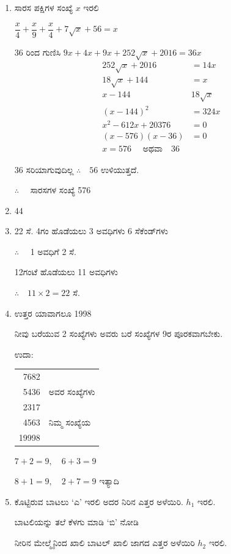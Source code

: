\begin{enumerate}
\item ಸಾರಸ ಪಕ್ಷಿಗಳ ಸಂಖ್ಯೆ $x$ ಇರಲಿ 

$\dfrac{x}{4} + \dfrac{x}{9} + \dfrac{x}{4} + 7\sqrt{x} + 56 = x$

36 ರಿಂದ ಗುಣಿಸಿ $9x + 4x + 9x + 252\sqrt{x} + 2016 = 36x$
\begin{align*}
252\sqrt{x} + 2016 & = 14x\\
18\sqrt{x} + 144 & = x\\
x - 144 & 18\sqrt{x}\\
(x - 144)^{2} & = 324x\\
x^{2} - 612x + 20376 & = 0\\
(x - 576) (x - 36) & = 0\\
x = 576\quad \text{ ಅಥವಾ}\quad 36 & 
\end{align*}

36 ಸರಿಯಾಗುವುದಿಲ್ಲ $\therefore\quad 56$ ಉಳಿಯುತ್ತದೆ. 

$\therefore\quad$ ಸಾರಸಗಳ ಸಂಖ್ಯೆ 576

\item 44

\item 22 ಸೆ. 4ಗಂ ಹೊಡೆಯಲು 3 ಅವಧಿಗಳು 6 ಸೆಕೆಂಡ್‌ಗಳು 

$\therefore\quad$ 1 ಅವಧಿಗೆ 2 ಸೆ.

12ಗಂಟೆ ಹೊಡೆಯಲು 11 ಅವಧಿಗಳು 

$\therefore\quad 11\times 2 = 22$ ಸೆ. 

\item ಉತ್ತರ ಯಾವಾಗಲೂ 1998

ನೀವು ಬರೆಯುವ 2 ಸಂಖ್ಯೆಗಳು ಅವರು ಬರೆ ಸಂಖ್ಯೆಗಳ 9ರ ಪೂರಕವಾಗಬೇಕು. 

ಉದಾ: 
\begin{tabular}[t]{rl}
7682 & \\
5436 & ಅವರ ಸಂಖ್ಯೆಗಳು \\
2317 &\\
4563 & ನಿಮ್ಮ ಸಂಖ್ಯೆಯ\\\cline{1-1}
19998 & 
\end{tabular}

$7 + 2 = 9,\quad 6 + 3 = 9$

$8 + 1 = 9,\quad 2 + 7 =9$ ಇತ್ಯಾದಿ 

\item ಕೊಟ್ಟಿರುವ ಬಾಟಲು `ಎ' ಇರಲಿ ಅದರ ನಿರಿನ ಎತ್ತರ ಅಳೆಯಿರಿ. $h_{1}$ ಇರಲಿ. 

ಬಾಟಲಿಯನ್ನು ತಲೆ ಕೆಳಗು ಮಾಡಿ `ಬಿ' ನೋಡಿ 

ನೀರಿನ ಮೇಲ್ಮೈನಿಂದ ಖಾಲಿ ಬಾಟಲ್ ಖಾಲಿ ಜಾಗದ ಎತ್ತರ ಅಳೆಯಿರಿ $h_{2}$ ಇರಲಿ. 


\end{enumerate}
